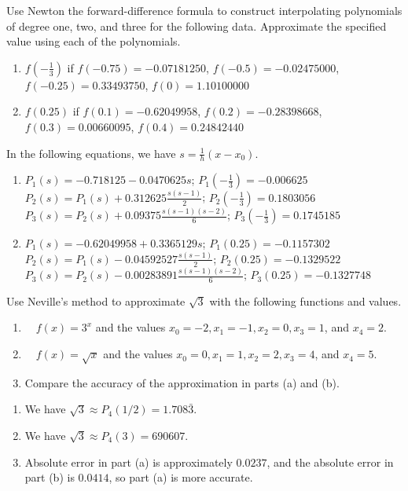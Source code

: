 \begin{posttest}%
\item Use Newton the forward-difference formula to construct interpolating polynomials of degree one, two, and three for the following data. Approximate the specified value using each of the polynomials.
\begin{enumerate}[label=(\alph*)]
\item $f\left(-\frac{1}{3}\right)$ if $f(-0.75)=-0.07181250$, $f(-0.5)=-0.02475000$, $f(-0.25)=0.33493750$, $f(0)=1.10100000$
\item $f(0.25)$ if $f(0.1)=-0.62049958$, $f(0.2)=-0.28398668$, $f(0.3)=0.00660095$, $f(0.4)=0.24842440$
\end{enumerate}
\begin{mysolution}
In the following equations, we have $s=\frac1h(x-x_0)$.
\begin{enumerate}[label=(\alph*)]
\item $P_1(s) =-0.718125-0.0470625s$; $P_1\left(-\frac13\right)=-0.006625$\\[3mm]
$P_2(s) = P_1(s) + 0.312625\frac{s(s-1)}{2}$; $P_2\left(-\frac13\right)=0.1803056$\\[3mm]
$P_3(s) = P_2(s) + 0.09375\frac{s(s-1)(s-2)}{6}$; $P_3\left(-\frac13\right)=0.1745185$\\
\item $P_1(s) =-0.62049958 +0.3365129s$; $P_1(0.25) =-0.1157302$\\
$P_2(s) = P_1(s)-0.04592527\frac{s(s − 1)}{2}$; $P_2(0.25) =-0.1329522$\\
$P_3(s) = P_2(s)-0.00283891\frac{s(s-1)(s-2)}{6}$; $P_3(0.25) =-0.1327748$
\end{enumerate}
\end{mysolution}

\item Use Neville's method to approximate $\sqrt{3}$ with the following functions and values.
\begin{enumerate}[label=(\alph*)]
\item $\quad f(x)=3^{x}$ and the values $x_{0}=-2, x_{1}=-1, x_{2}=0, x_{3}=1$, and $x_{4}=2$.
\item $\quad f(x)=\sqrt{x}$ and the values $x_{0}=0, x_{1}=1, x_{2}=2, x_{3}=4$, and $x_{4}=5$.
\item Compare the accuracy of the approximation in parts (a) and (b).
\end{enumerate}
\begin{mysolution}
\begin{enumerate}[label=\arabic*.]
\item We have $\sqrt{3}\approx P_4(1/2) = 1.708\bar{3}$.
\item We have $\sqrt{3}\approx P_4(3) = 690607$.
\item Absolute error in part (a) is approximately $0.0237$, and the absolute error in part (b) is $0.0414$, so part (a) is more accurate.
\end{enumerate}
\end{mysolution}


\end{posttest}
